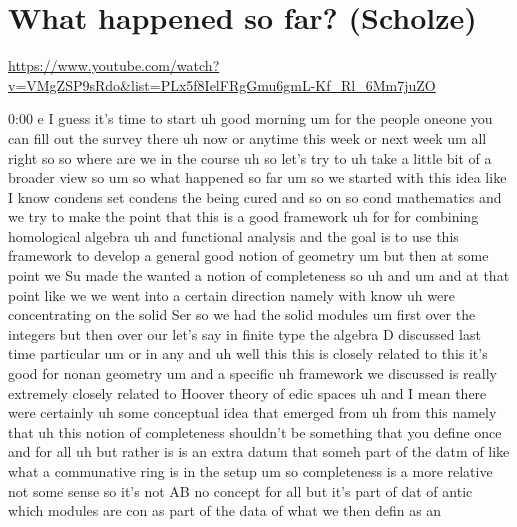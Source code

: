 
\section{\ufs What happened so far? (Scholze)}

\url{https://www.youtube.com/watch?v=VMgZSP9sRdo&list=PLx5f8IelFRgGmu6gmL-Kf_Rl_6Mm7juZO}
\renewcommand{\yt}[2]{\href{https://www.youtube.com/watch?v=VMgZSP9sRdo&list=PLx5f8IelFRgGmu6gmL-Kf_Rl_6Mm7juZO&t=#1}{#2}}
\vspace{1em}

\begin{unfinished}{0:00}
e
I  guess  it's  time  to  start  uh  good
morning  um  for  the  people  oneone  you  can
fill  out  the  survey  there  uh  now  or
anytime  this  week  or  next  week
um  all  right  so  so  where  are  we  in  the
course  uh  so  let's  try  to  uh  take  a
little  bit  of  a  broader  view  so
um  so  what  happened  so
far
um  so  we  started  with  this  idea  like  I
know  condens  set  condens  the  being  cured
and  so  on
so  cond  mathematics  and  we  try  to  make
the  point  that  this  is  a  good
framework  uh
for  for  combining  homological
algebra  uh  and  functional
analysis
and  the  goal  is  to  use  this  framework  to
develop  a  general  good  notion  of
geometry
um  but  then  at  some  point  we  Su  made  the
wanted  a  notion  of  completeness  so
uh
and
um  and  at  that  point  like  we  we  went
into  a  certain  direction  namely  with
know  uh  were  concentrating  on  the  solid
Ser  so  we  had  the  solid
modules
um  first  over  the  integers  but  then  over
our  let's  say  in  finite
type  the  algebra  D  discussed  last  time
particular  um  or  in
any
and  uh  well  this  this  is  closely  related
to
this  it's  good  for  nonan
geometry  um  and  a
specific  uh  framework  we  discussed  is
really  extremely  closely  related  to
Hoover  theory  of  edic
spaces  uh  and  I  mean  there  were
certainly  uh  some  conceptual  idea  that
emerged  from  uh  from  this  namely  that  uh
this  notion  of  completeness  shouldn't  be
something  that  you  define  once  and  for
all  uh  but  rather  is  is  an  extra  datum
that  someh  part  of  the  datm  of  like  what
a  communative  ring  is  in  the  setup
um  so
completeness  is  a  more  relative
not  some  sense  so
it's  not  AB  no  concept  for  all  but  it's
part  of  dat  of
antic  which  modules  are  con  as  part  of
the  data  of  what
we  then  defin  as  an

\end{unfinished}

